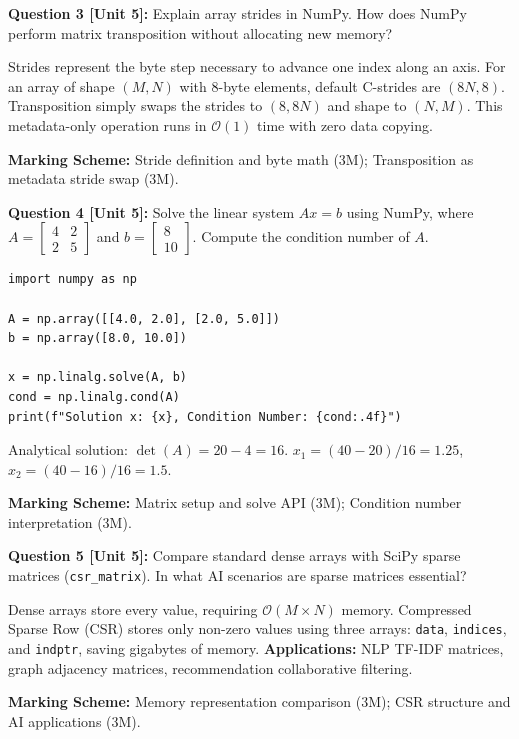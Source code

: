 \noindent\textbf{Question 3 [Unit 5]:} Explain array strides in NumPy. How does NumPy perform matrix transposition without allocating new memory?
\begin{solutionbox}
Strides represent the byte step necessary to advance one index along an axis. For an array of shape $(M, N)$ with 8-byte elements, default C-strides are $(8N, 8)$. Transposition simply swaps the strides to $(8, 8N)$ and shape to $(N, M)$. This metadata-only operation runs in $\mathcal{O}(1)$ time with zero data copying.
\end{solutionbox}
\begin{markingrubric}
\textbf{Marking Scheme:} Stride definition and byte math (3M); Transposition as metadata stride swap (3M).
\end{markingrubric}

\noindent\textbf{Question 4 [Unit 5]:} Solve the linear system $A x = b$ using NumPy, where $A = \begin{bmatrix} 4 & 2 \\ 2 & 5 \end{bmatrix}$ and $b = \begin{bmatrix} 8 \\ 10 \end{bmatrix}$. Compute the condition number of $A$.
\begin{solutionbox}
\begin{lstlisting}
import numpy as np

A = np.array([[4.0, 2.0], [2.0, 5.0]])
b = np.array([8.0, 10.0])

x = np.linalg.solve(A, b)
cond = np.linalg.cond(A)
print(f"Solution x: {x}, Condition Number: {cond:.4f}")
\end{lstlisting}
Analytical solution: $\det(A) = 20 - 4 = 16$. $x_1 = (40 - 20)/16 = 1.25$, $x_2 = (40 - 16)/16 = 1.5$.
\end{solutionbox}
\begin{markingrubric}
\textbf{Marking Scheme:} Matrix setup and solve API (3M); Condition number interpretation (3M).
\end{markingrubric}

\noindent\textbf{Question 5 [Unit 5]:} Compare standard dense arrays with SciPy sparse matrices (\texttt{csr\_matrix}). In what AI scenarios are sparse matrices essential?
\begin{solutionbox}
Dense arrays store every value, requiring $\mathcal{O}(M \times N)$ memory. Compressed Sparse Row (CSR) stores only non-zero values using three arrays: \texttt{data}, \texttt{indices}, and \texttt{indptr}, saving gigabytes of memory.
\textbf{Applications:} NLP TF-IDF matrices, graph adjacency matrices, recommendation collaborative filtering.
\end{solutionbox}
\begin{markingrubric}
\textbf{Marking Scheme:} Memory representation comparison (3M); CSR structure and AI applications (3M).
\end{markingrubric}

